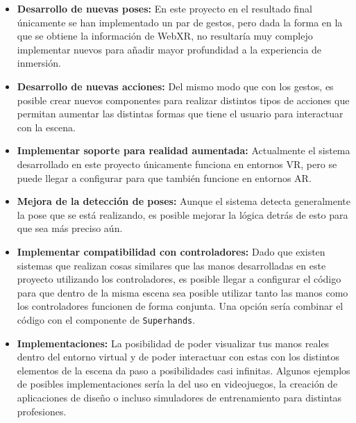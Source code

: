 \documentclass[a4paper, 12pt]{book}
\begin{document}
\begin{itemize}
  \item \textbf{Desarrollo de nuevas poses:} En este proyecto en el resultado final únicamente se han implementado un par de gestos, pero dada la forma en la que se obtiene la información de WebXR, no resultaría muy complejo implementar nuevos para añadir mayor profundidad a la experiencia de inmersión.
  \item \textbf{Desarrollo de nuevas acciones:} Del mismo modo que con los gestos, es posible crear nuevos componentes para realizar distintos tipos de acciones que permitan aumentar las distintas formas que tiene el usuario para interactuar con la escena.
  \item \textbf{Implementar soporte para realidad aumentada:} Actualmente el sistema desarrollado en este proyecto únicamente funciona en entornos VR, pero se puede llegar a configurar para que también funcione en entornos AR.
  \item \textbf{Mejora de la detección de poses:} Aunque el sistema detecta generalmente la pose que se está realizando, es posible mejorar la lógica detrás de esto para que sea más preciso aún.
  \item \textbf{Implementar compatibilidad con controladores:} Dado que existen sistemas que realizan cosas similares que las manos desarrolladas en este proyecto utilizando los controladores, es posible llegar a configurar el código para que dentro de la misma escena sea posible utilizar tanto las manos como los controladores funcionen de forma conjunta. Una opción sería combinar el código con el componente de \texttt{Superhands}.
  \item \textbf{Implementaciones:} La posibilidad de poder visualizar tus manos reales dentro del entorno virtual y de poder interactuar con estas con los distintos elementos de la escena da paso a posibilidades casi infinitas. Algunos ejemplos de posibles implementaciones sería la del uso en videojuegos, la creación de aplicaciones de diseño o incluso simuladores de entrenamiento para distintas profesiones.
\end{itemize}

\cleardoublepage


 
\end{document}
